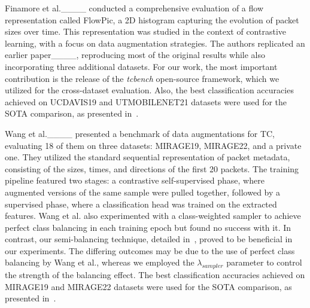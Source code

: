 Finamore et al.____ conducted a comprehensive evaluation of a flow representation called FlowPic, a 2D histogram capturing the evolution of packet sizes over time. This representation was studied in the context of contrastive learning, with a focus on data augmentation strategies. The authors replicated an earlier paper____, reproducing most of the original results while also incorporating three additional datasets. For our work, the most important contribution is the release of the \textit{tcbench} open-source framework, which we utilized for the cross-dataset evaluation. Also, the best classification accuracies achieved on UCDAVIS19 and UTMOBILENET21 datasets were used for the SOTA comparison, as presented in~.

Wang et al.____ presented a benchmark of data augmentations for TC, evaluating 18 of them on three datasets: MIRAGE19, MIRAGE22, and a private one. They utilized the standard sequential representation of packet metadata, consisting of the sizes, times, and directions of the first 20 packets. The training pipeline featured two stages: a contrastive self-supervised phase, where augmented versions of the same sample were pulled together, followed by a supervised phase, where a classification head was trained on the extracted features. Wang et al. also experimented with a class-weighted sampler to achieve perfect class balancing in each training epoch but found no success with it. In contrast, our semi-balancing technique, detailed in~, proved to be beneficial in our experiments. The differing outcomes may be due to the use of perfect class balancing by Wang et al., whereas we employed the $\lambda_{sampler}$ parameter to control the strength of the balancing effect. The best classification accuracies achieved on MIRAGE19 and MIRAGE22 datasets were used for the SOTA comparison, as presented in~.